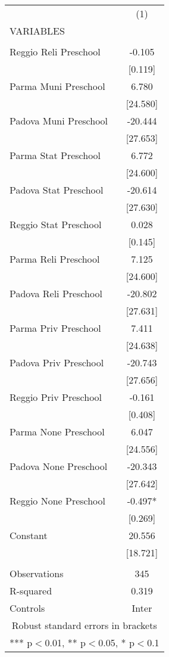 \begin{tabular}{lc} \hline
 & (1) \\
VARIABLES &  \\ \hline
 &  \\
Reggio Reli Preschool & -0.105 \\
 & [0.119] \\
Parma Muni Preschool & 6.780 \\
 & [24.580] \\
Padova Muni Preschool & -20.444 \\
 & [27.653] \\
Parma Stat Preschool & 6.772 \\
 & [24.600] \\
Padova Stat Preschool & -20.614 \\
 & [27.630] \\
Reggio Stat Preschool & 0.028 \\
 & [0.145] \\
Parma Reli Preschool & 7.125 \\
 & [24.600] \\
Padova Reli Preschool & -20.802 \\
 & [27.631] \\
Parma Priv Preschool & 7.411 \\
 & [24.638] \\
Padova Priv Preschool & -20.743 \\
 & [27.656] \\
Reggio Priv Preschool & -0.161 \\
 & [0.408] \\
Parma None Preschool & 6.047 \\
 & [24.556] \\
Padova None Preschool & -20.343 \\
 & [27.642] \\
Reggio None Preschool & -0.497* \\
 & [0.269] \\
Constant & 20.556 \\
 & [18.721] \\
 &  \\
Observations & 345 \\
R-squared & 0.319 \\
 Controls & Inter \\ \hline
\multicolumn{2}{c}{ Robust standard errors in brackets} \\
\multicolumn{2}{c}{ *** p$<$0.01, ** p$<$0.05, * p$<$0.1} \\
\end{tabular}
